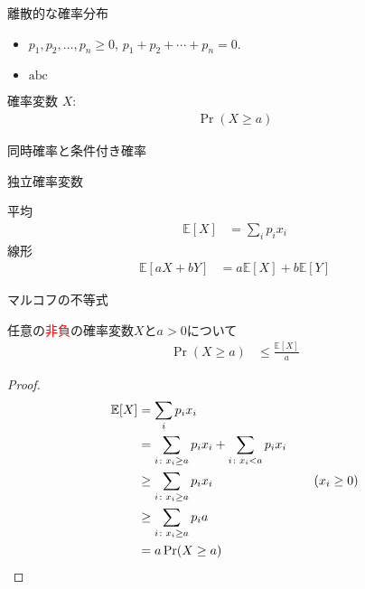 \documentclass[lualatex,handout]{beamer}
\newcommand{\emm}[1]{\textcolor{red}{#1}}
\newcommand{\expt}[1]{\mathbb{E}[#1]}
\theoremstyle{definition}
\begin{document}
\begin{frame}{離散的な確率分布}
\begin{itemize}
\item $p_1, p_2, \dotsc, p_n\ge 0$, $p_1+p_2+\dotsb+p_n=0$.
\item $\mathrm{abc}$
\end{itemize}
\end{frame}

\begin{frame}{確率変数}
$X\colon $
\begin{align*}
\Pr(X\ge a)
\end{align*}
\end{frame}

\begin{frame}{同時確率と条件付き確率}

\end{frame}

\begin{frame}{独立確率変数}

\end{frame}

\begin{frame}{平均}
\begin{align*}
\expt{X} &= \sum_i p_i x_i
\end{align*}
線形
\begin{align*}
\expt{aX + bY} &= a\expt{X} + b\expt{Y} 
\end{align*}
\end{frame}

\begin{frame}{マルコフの不等式}
\begin{theorem}[マルコフの不等式]
任意の\emm{非負}の確率変数$X$と$a>0$について
\begin{align*}
\Pr(X\ge a) &\le \frac{\expt{X}}{a}
\end{align*}
\end{theorem}
\begin{proof}
\vspace{-2em}
\begin{align*}
\expt{X} &= \sum_i p_i x_i\\
&= \sum_{i\colon x_i \ge a} p_i x_i
+ \sum_{i\colon x_i < a} p_i x_i\\
&\ge \sum_{i\colon x_i \ge a} p_i x_i\hspace{8em}(x_i\ge 0)\\
&\ge \sum_{i\colon x_i \ge a} p_i a\\
&= a\Pr(X\ge a) \qedhere
\end{align*}
\end{proof}
\end{frame}
\end{document}
